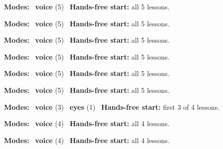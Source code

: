 \expandafter\def\csname hlchaptermodality375\endcsname{%
  {\small\noindent
    \textbf{Modes:} \hlvoicesign{}~\textbf{voice} (5)\quad
    \hlvoicesign{}~\textbf{Hands-free start:} all 5 lessons.%
    \par}\medskip
}

\expandafter\def\csname hlchaptermodality376\endcsname{%
  {\small\noindent
    \textbf{Modes:} \hlvoicesign{}~\textbf{voice} (5)\quad
    \hlvoicesign{}~\textbf{Hands-free start:} all 5 lessons.%
    \par}\medskip
}

\expandafter\def\csname hlchaptermodality377\endcsname{%
  {\small\noindent
    \textbf{Modes:} \hlvoicesign{}~\textbf{voice} (5)\quad
    \hlvoicesign{}~\textbf{Hands-free start:} all 5 lessons.%
    \par}\medskip
}

\expandafter\def\csname hlchaptermodality378\endcsname{%
  {\small\noindent
    \textbf{Modes:} \hlvoicesign{}~\textbf{voice} (5)\quad
    \hlvoicesign{}~\textbf{Hands-free start:} all 5 lessons.%
    \par}\medskip
}

\expandafter\def\csname hlchaptermodality379\endcsname{%
  {\small\noindent
    \textbf{Modes:} \hlvoicesign{}~\textbf{voice} (5)\quad
    \hlvoicesign{}~\textbf{Hands-free start:} all 5 lessons.%
    \par}\medskip
}

\expandafter\def\csname hlchaptermodality380\endcsname{%
  {\small\noindent
    \textbf{Modes:} \hlvoicesign{}~\textbf{voice} (5)\quad
    \hlvoicesign{}~\textbf{Hands-free start:} all 5 lessons.%
    \par}\medskip
}

\expandafter\def\csname hlchaptermodality381\endcsname{%
  {\small\noindent
    \textbf{Modes:} \hlvoicesign{}~\textbf{voice} (3) \quad \hlsightsign{}~\textbf{eyes} (1)\quad
    \hlvoicesign{}~\textbf{Hands-free start:} first 3 of 4 lessons.%
    \par}\medskip
}

\expandafter\def\csname hlchaptermodality382\endcsname{%
  {\small\noindent
    \textbf{Modes:} \hlvoicesign{}~\textbf{voice} (4)\quad
    \hlvoicesign{}~\textbf{Hands-free start:} all 4 lessons.%
    \par}\medskip
}

\expandafter\def\csname hlchaptermodality383\endcsname{%
  {\small\noindent
    \textbf{Modes:} \hlvoicesign{}~\textbf{voice} (4)\quad
    \hlvoicesign{}~\textbf{Hands-free start:} all 4 lessons.%
    \par}\medskip
}

